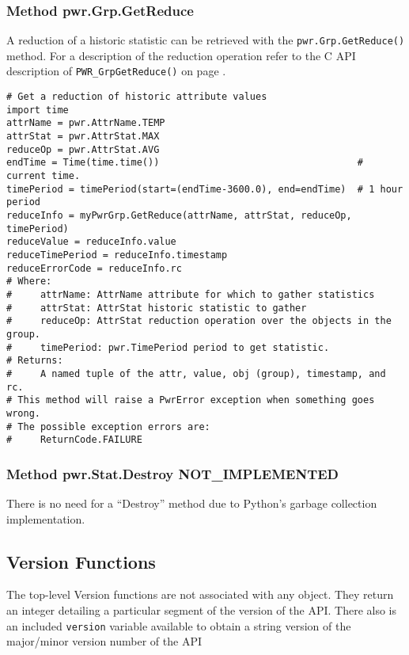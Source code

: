 \documentclass[12pt]{report} %
\begin{document}
\begin{appendices}
\subsubsection{Method pwr.Grp.GetReduce} \label{meth:GrpGetReduce}

A reduction of a historic statistic can be retrieved with the
\texttt{pwr.Grp.GetReduce()} method. For a description of the reduction
operation refer to the C API description of \texttt{PWR_GrpGetReduce()} on page
\pageref{func:GrpGetReduce}.

\begin{center}\begin{minipage}{.95\linewidth}\begin{lstlisting}
# Get a reduction of historic attribute values
import time
attrName = pwr.AttrName.TEMP
attrStat = pwr.AttrStat.MAX
reduceOp = pwr.AttrStat.AVG
endTime = Time(time.time())                                   # current time.
timePeriod = timePeriod(start=(endTime-3600.0), end=endTime)  # 1 hour period
reduceInfo = myPwrGrp.GetReduce(attrName, attrStat, reduceOp, timePeriod)
reduceValue = reduceInfo.value
reduceTimePeriod = reduceInfo.timestamp
reduceErrorCode = reduceInfo.rc
# Where:
#     attrName: AttrName attribute for which to gather statistics
#     attrStat: AttrStat historic statistic to gather
#     reduceOp: AttrStat reduction operation over the objects in the group.
#     timePeriod: pwr.TimePeriod period to get statistic.
# Returns:
#     A named tuple of the attr, value, obj (group), timestamp, and rc.
# This method will raise a PwrError exception when something goes wrong.
# The possible exception errors are:
#     ReturnCode.FAILURE
\end{lstlisting}\end{minipage}\end{center}


\subsubsection{Method pwr.Stat.Destroy NOT_IMPLEMENTED}
\label{meth:StatDestroy}

There is no need for a ``Destroy'' method due to Python's garbage collection implementation.

\subsection{Version Functions} \label{sec:PythonVersionFunctions}
The top-level Version functions are not associated with any object. They return
an integer detailing a particular segment of the version of the API. There also
is an included \texttt{version} variable available to obtain a string version of the
major/minor version number of the API


\end{appendices}
\end{document}
